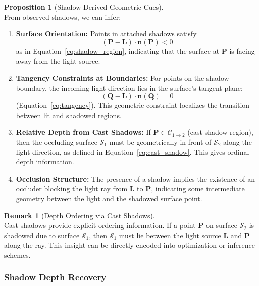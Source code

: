 \documentclass[12pt]{article}
\newcommand{\vect}[1]{\bm{#1}}
\theoremstyle{definition}
\newtheorem{proposition}{Proposition}[subsection]
\newtheorem{remark}{Remark}[subsection]
\begin{document}
\begin{proposition}[Shadow-Derived Geometric Cues] \label{prop:shadow_cues} ~\\
From observed shadows, we can infer:
\begin{enumerate}[label=(\roman*)]
    \item \textbf{Surface Orientation:} Points in attached shadows satisfy
    \[
    (\vect{P} - \vect{L}) \cdot \vect{n}(\vect{P}) < 0
    \]
    as in Equation~\eqref{eq:shadow_region}, indicating that the surface at $\vect{P}$ is facing away from the light source.

    \item \textbf{Tangency Constraints at Boundaries:} For points on the shadow boundary, the incoming light direction lies in the surface's tangent plane:
    \[
    (\vect{Q} - \vect{L}) \cdot \vect{n}(\vect{Q}) = 0
    \]
    (Equation~\eqref{eq:tangency}). This geometric constraint localizes the transition between lit and shadowed regions.

    \item \textbf{Relative Depth from Cast Shadows:} If $\vect{P} \in \mathcal{C}_{1 \to 2}$ (cast shadow region), then the occluding surface $\mathcal{S}_1$ must be geometrically in front of $\mathcal{S}_2$ along the light direction, as defined in Equation~\eqref{eq:cast_shadow}. This gives ordinal depth information.

    \item \textbf{Occlusion Structure:} The presence of a shadow implies the existence of an occluder blocking the light ray from $\vect{L}$ to $\vect{P}$, indicating some intermediate geometry between the light and the shadowed surface point.
\end{enumerate}
\end{proposition}

\begin{remark}[Depth Ordering via Cast Shadows] \label{rmk:depth_order} ~\\
Cast shadows provide explicit ordering information. If a point $\vect{P}$ on surface $\mathcal{S}_2$ is shadowed due to surface $\mathcal{S}_1$, then $\mathcal{S}_1$ must lie between the light source $\vect{L}$ and $\vect{P}$ along the ray. This insight can be directly encoded into optimization or inference schemes.
\end{remark}

\newpage

\subsubsection*{Shadow Depth Recovery} \label{sec:shadow_depth}
\end{document}
